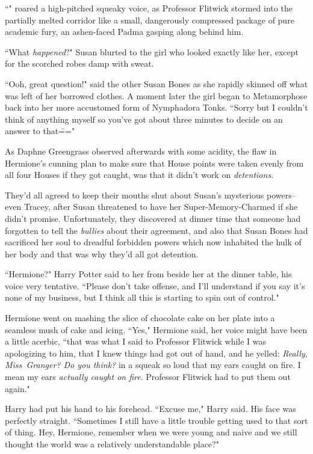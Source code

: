 ``" roared a high-pitched squeaky voice, as Professor Flitwick stormed into the partially melted corridor like a small, dangerously compressed package of pure academic fury, an ashen-faced Padma gasping along behind him.

\later

``What \emph{happened}?" Susan blurted to the girl who looked exactly like her, except for the scorched robes damp with sweat.

``Ooh, great question!" said the other Susan Bones as she rapidly skinned off what was left of her borrowed clothes. A moment later the girl began to Metamorphose back into her more accustomed form of Nymphadora Tonks. ``Sorry but I couldn't think of anything myself so you've got about three minutes to decide on an answer to that\==="

\later

As Daphne Greengrass observed afterwards with some acidity, the flaw in Hermione's cunning plan to make sure that House points were taken evenly from all four Houses if they got caught, was that it didn't work on \emph{detentions}.

They'd all agreed to keep their mouths shut about Susan's mysterious powers\---even Tracey, after Susan threatened to have her Super-Memory-Charmed if she didn't promise. Unfortunately, they discovered at dinner time that someone had forgotten to tell the \emph{bullies} about their agreement, and also that Susan Bones had sacrificed her soul to dreadful forbidden powers which now inhabited the hulk of her body and that was why they'd all got detention.

``Hermione?" Harry Potter said to her from beside her at the dinner table, his voice very tentative. ``Please don't take offense, and I'll understand if you say it's none of my business, but I think all this is starting to spin out of control."

Hermione went on mashing the slice of chocolate cake on her plate into a seamless mush of cake and icing. ``Yes," Hermione said, her voice might have been a little acerbic, ``that was what I said to Professor Flitwick while I was apologizing to him, that I knew things had got out of hand, and he yelled: \emph{Really, Miss~Granger? Do you think?} in a squeak so loud that my ears caught on fire. I mean my ears \emph{actually caught on fire}. Professor Flitwick had to put them out again."

Harry had put his hand to his forehead. ``Excuse me," Harry said. His face was perfectly straight. ``Sometimes I still have a little trouble getting used to that sort of thing. Hey, Hermione, remember when we were young and naive and we still thought the world was a relatively understandable place?"

